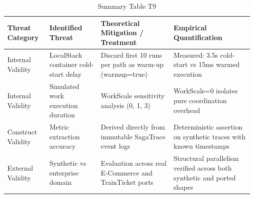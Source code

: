 \begin{table}[htbp]
\centering
\caption{Summary Table T9}
\label{tab:t9}
\begin{tabular}{llll}
\toprule
Threat Category & Identified Threat & Theoretical Mitigation / Treatment & Empirical Quantification \\
\midrule
Internal Validity & LocalStack container cold-start delay & Discard first 10 runs per path as warm-up (warmup=true) & Measured: 3.5s cold-start vs 15ms warmed execution \\
Internal Validity & Simulated work execution duration & WorkScale sensitivity analysis (0, 1, 3) & WorkScale=0 isolates pure coordination overhead \\
Construct Validity & Metric extraction accuracy & Derived directly from immutable SagaTrace event logs & Deterministic assertion on synthetic traces with known timestamps \\
External Validity & Synthetic vs enterprise domain & Evaluation across real E-Commerce and TrainTicket ports & Structural parallelism verified across both synthetic and ported shapes \\
\bottomrule
\end{tabular}
\end{table}
